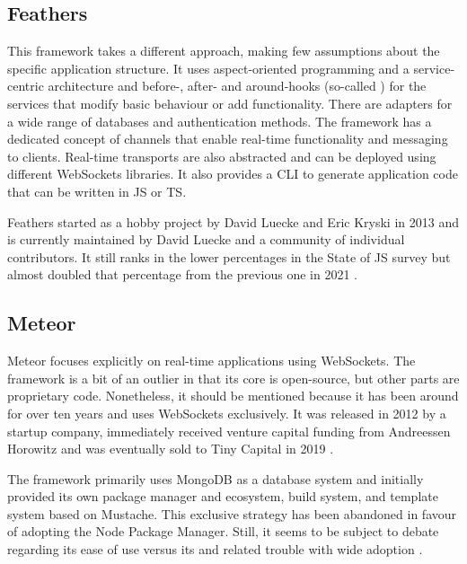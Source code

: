\subsection{Feathers}

This framework takes a different approach, making few assumptions about the specific application structure. It uses aspect-oriented programming and a service-centric architecture and before-, after- and around-hooks (so-called ) for the services that modify basic behaviour or add functionality. There are adapters for a wide range of databases and authentication methods. The framework has a dedicated concept of channels that enable real-time functionality and messaging to clients. Real-time transports are also abstracted and can be deployed using different WebSockets libraries. It also provides a \ac{CLI} to generate application code that can be written in \ac{JS} or \ac{TS}.

Feathers started as a hobby project by David Luecke and Eric Kryski in 2013 \parencite{feathersFrameworkHistory} and is currently maintained by David Luecke and a community of individual contributors. It still ranks in the lower percentages in the State of JS survey but almost doubled that percentage from the previous one in 2021 \parencite{mostUsedBackendFrameworks21}.

\subsection{Meteor}

Meteor focuses explicitly on real-time applications using WebSockets. The framework is a bit of an outlier in that its core is open-source, but other parts are proprietary code. Nonetheless, it should be mentioned because it has been around for over ten years and uses WebSockets exclusively. It was released in 2012 by a startup company, immediately received venture capital funding from Andreessen Horowitz and was eventually sold to Tiny Capital in 2019 \parencite{meteorSaleTinyCapital}.

The framework primarily uses MongoDB as a database system and initially provided its own package manager and ecosystem, build system, and template system based on Mustache. This exclusive strategy has been abandoned in favour of adopting the Node Package Manager. Still, it seems to be subject to debate regarding its ease of use versus its  and related trouble with wide adoption \parencite{meteorDiscussionYCombinator}.




